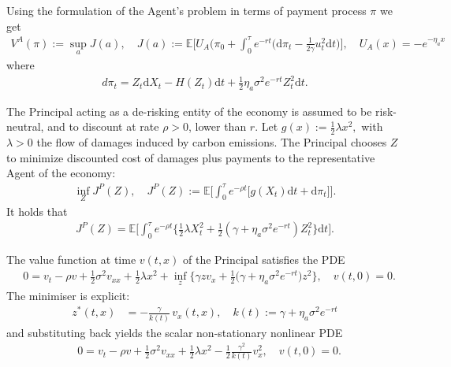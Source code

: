 \documentclass[a4paper,10pt]{article}
\newcommand{\E}{\mathbb{E}}
\newcommand{\dd}{\mathrm{d}}
\theoremstyle{definition}
\theoremstyle{plain}
\numberwithin{equation}{section}
\begin{document}
Using the formulation of the Agent's problem in terms of payment process $\pi$ we get
\begin{align*}
V^A(\pi) := \sup_{a} J(a), \quad J(a) := \E\Big[U_A\Big(\pi_0 +  \int_0^\tau  e^{-r t} (\dd \pi_t - \frac1{2 \gamma} u_t^2 \dd t \Big)\Big],
\quad U_A(x) = -e^{-\eta_a x}
\end{align*}
where
\begin{align*}
d\pi_t =   Z_t \dd X_t - H(Z_t) \dd t + \frac12 \eta_a \sigma^2 e^{-r t} Z_t^2 \dd t. 
\end{align*}

The Principal acting as a de-risking entity of the economy is assumed to be risk-neutral, and to discount at rate $\rho>0$, lower than  $r$. Let $g(x) := \frac{1}{2}\lambda x^2,$ with $\lambda>0$ the flow of damages induced by carbon emissions. The Principal chooses $Z$ to minimize discounted cost of damages plus payments to the representative Agent of the economy:
\begin{align}
 \inf_{Z}  J^P(Z), \quad J^P(Z) := \E\Big[ \int_0^\tau e^{-\rho t} \big[g(X_t)\dd t +  \dd \pi_t \big] \Big].
\end{align}
It holds that
\begin{align}
 J^P(Z) = \E\Big[ \int_0^\tau e^{-\rho t} \Big\{  \frac12 \lambda X_t^2 + \frac12 (\gamma + \eta_a \sigma^2 e^{-r t}) Z_t^2 \Big\} \dd t\Big].
\end{align}

The value function at time $v(t,x)$ of the Principal satisfies the PDE
\begin{align}
&0
=
v_t - \rho v
+\frac{1}{2}\sigma^2 v_{xx}
+ \frac{1}{2}\lambda x^2
+\inf_{z}
\Big\{\gamma z v_x
+ \frac{1}{2}\big(\gamma+\eta_a\sigma^2 e^{-rt}\big)z^2
\Big\},
\quad
v(t,0) = 0.
\end{align}
The minimiser is explicit:
\begin{align}
z^*(t,x)
&=
- \frac{\gamma}{k(t)}\,v_x(t,x), \quad k(t) := \gamma+\eta_a\sigma^2 e^{-rt}
\end{align}
and substituting back yields the scalar non-stationary nonlinear PDE
\begin{align}
&0 = v_t   - \rho v  
+\frac{1}{2}\sigma^2 v_{xx}  
+\frac{1}{2}\lambda x^2
- \frac{1}{2}\frac{\gamma^2}{k(t)}v_x^2,
\quad
v(t,0) = 0.
\end{align}
\end{document}
